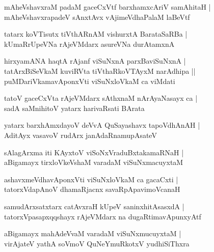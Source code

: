 \documentclass[twoside,12pt,openright]{book}
\newcounter{shloka}[chapter]
\begin{document}
\begin{shloka}
mAheVshavxraM padaM gaceCxVtf barxhamxcAriV samAhitaH |\\
mAheVshavxrapadeV sAnxtAvx vAjimeVdhaPalaM laBeVtf 
\end{shloka}

\begin{shloka}
tatarx koVTisutx tiVthARnAM vishurxtA BarataSaRBa |\\
kUmaRrUpeVNa rAjeVMdarx asureVNa durAtamxnA 
\end{shloka}

\begin{shloka}
hirxyamANA haqtA rAjanf viSuNxnA parxBaviSuNxnA |\\
tatArxBiSeVkaM kuviRVta tiVthaRkoVTAyxM narAdhipa ||\\
puMDariVkamavAponxVti viSuNxloVkaM ca viMdati 
\end{shloka}

\begin{shloka}
tatoV gaceCxVta rAjeVMdarx sAthxnaM nArAyaNasayx ca |\\
sadA saMnihitoV yatarx harivaRsati BArata
\end{shloka}

\begin{shloka}
yatarx barxhAmxdayoV deVvA QuSayashavx tapoVdhAnAH |\\
AditAyx vasavoV rudArx janAdaRnamupAsateV 
\end{shloka}

\begin{shloka}
sAlagArxma iti KAyxtoV viSoNxVraduBxtakamaRNaH |\\
aBigamayx tirxloVkeVshaM varadaM viSuNxmacuyxtaM 
\end{shloka}

\begin{shloka}
ashavxmeVdhavAponxVti viSuNxloVkaM ca gacaCxti |\\
tatorxVdapAnoV dhamaRjacnx savaRpApavimoVcanaH 
\end{shloka}

\begin{shloka}
samudArxsatxtarx catAvxraH kUpeV saninxhitAsasxdA |\\
tatorxVpasapxqqshayx rAjeVMdarx na dugaRtimavApunxyAtf 
\end{shloka}

\begin{shloka}
aBigamayx mahAdeVvaM varadaM viSuNxmucuyxtaM |\\
virAjateV yathA soVmoV QuNeYmuRkotxV yudhiSiThxra 
\end{shloka}
\end{document}
